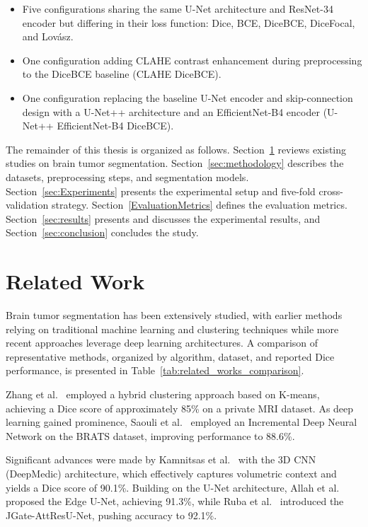 \documentclass[a4paper,12pt]{article}
\begin{document}
\begin{itemize}
    \item Five configurations sharing the same U-Net architecture and ResNet-34 encoder but
          differing in their loss function: Dice, BCE, DiceBCE, DiceFocal, and Lovász.
    \item One configuration adding CLAHE contrast enhancement during preprocessing to the
          DiceBCE baseline (CLAHE DiceBCE).
    \item One configuration replacing the baseline U-Net encoder and skip-connection design with
          a U-Net++ architecture and an EfficientNet-B4 encoder (U-Net++ EfficientNet-B4 DiceBCE).
\end{itemize}

The remainder of this thesis is organized as follows. Section~\ref{sec:related_works} reviews
existing studies on brain tumor segmentation. Section~\ref{sec:methodology} describes the
datasets, preprocessing steps, and segmentation models. Section~\ref{sec:Experiments} presents
the experimental setup and five-fold cross-validation strategy. Section~\ref{EvaluationMetrics}
defines the evaluation metrics. Section~\ref{sec:results} presents and discusses the
experimental results, and Section~\ref{sec:conclusion} concludes the study.


\section{Related Work}
\label{sec:related_works}

Brain tumor segmentation has been extensively studied, with earlier methods relying on
traditional machine learning and clustering techniques while more recent approaches leverage
deep learning architectures. A comparison of representative methods, organized by algorithm,
dataset, and reported Dice performance, is presented in Table~\ref{tab:related_works_comparison}.

Zhang et al.\ \cite{zhang2019brain} employed a hybrid clustering approach based on K-means,
achieving a Dice score of approximately 85\% on a private MRI dataset. As deep learning gained
prominence, Saouli et al.\ \cite{saouli2018fully} employed an Incremental Deep Neural Network
on the BRATS dataset, improving performance to 88.6\%.

Significant advances were made by Kamnitsas et al.\ \cite{kamnitsas2017efficient} with the 3D
CNN (DeepMedic) architecture, which effectively captures volumetric context and yields a Dice
score of 90.1\%. Building on the U-Net architecture, Allah et al.\ \cite{allah2023edge} proposed
the Edge U-Net, achieving 91.3\%, while Ruba et al.\ \cite{ruba2023brain} introduced the
JGate-AttResU-Net, pushing accuracy to 92.1\%.
\end{document}
